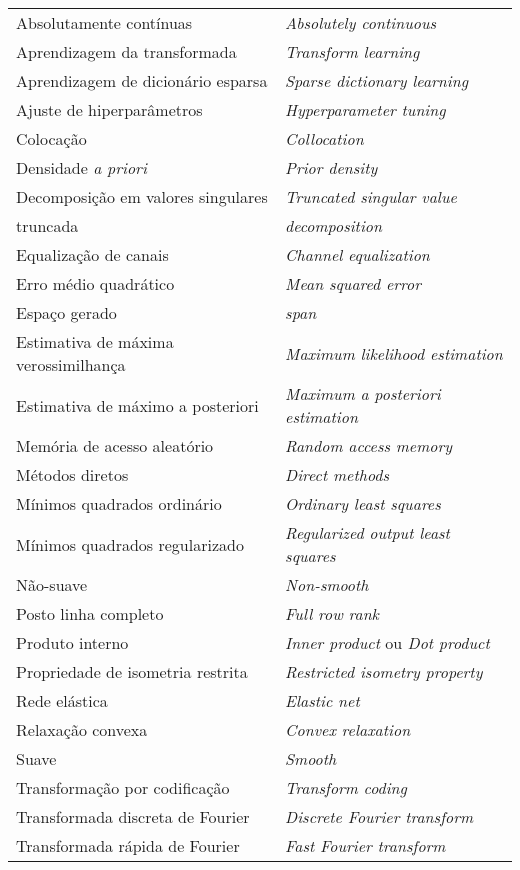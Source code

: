 \begin{table}[H]
\begin{center}
\begin{tabular}{ l l }
Absolutamente contínuas & \textit{Absolutely continuous}\\
Aprendizagem da transformada & \textit{Transform learning}\\
Aprendizagem de dicionário esparsa & \textit{Sparse dictionary learning}\\
Ajuste de hiperparâmetros & \textit{Hyperparameter tuning} \\
Colocação &  \textit{Collocation}\\
Densidade \textit{a priori} & \textit{Prior density} \\
Decomposição em valores singulares& \textit{Truncated singular value}\\ 
\quad truncada & \quad \textit{decomposition}\\ 
Equalização de canais & \textit{Channel equalization}\\
Erro médio quadrático & \textit{Mean squared error}\\
Espaço gerado &  \textit{span}\\
Estimativa de máxima verossimilhança & \textit{Maximum likelihood estimation}\\
Estimativa de máximo a posteriori &  \textit{Maximum a posteriori estimation}\\
Memória de acesso aleatório & \textit{Random access memory}\\
Métodos diretos & \textit{Direct methods}\\
Mínimos quadrados ordinário & \textit{Ordinary least squares}\\
Mínimos quadrados regularizado & \textit{Regularized output least squares} \\
Não-suave & \textit{Non-smooth}\\
Posto linha completo & \textit{Full row rank} \\
Produto interno & \textit{Inner product} ou \textit{Dot product} \\
Propriedade de isometria restrita & \textit{Restricted isometry property}\\
Rede elástica & \textit{Elastic net}\\
Relaxação convexa & \textit{Convex relaxation}\\
Suave & \textit{Smooth} \\
Transformação por codificação & \textit{Transform coding}\\
Transformada discreta de Fourier & \textit{Discrete Fourier transform}\\
Transformada rápida de Fourier &  \textit{Fast Fourier transform}\\ 
\end{tabular}
\end{center}
\end{table}
 
